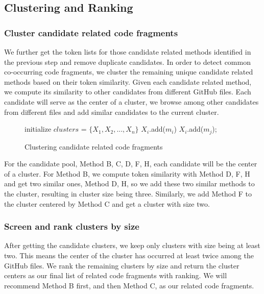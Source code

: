 \subsection{Clustering and Ranking}
\subsubsection{Cluster candidate related code fragments}
We further get the token lists for those candidate related methods identified in the previous step and remove duplicate candidates. In order to detect common co-occurring code fragments, we cluster the remaining unique candidate related methods
based on their token similarity.  Given each candidate related method, we compute its similarity to other candidates from different GitHub files. Each candidate will serve as the center of a cluster, we browse among other candidates from different files and add similar candidates to the current cluster.

\begin{figure}[h]
	\label{alg: Clustering candidate related methods}
	\removelatexerror
	\begin{algorithm}[H]
		\caption{Clustering candidate related code fragments}
		initialize $clusters$ = $\{X_1, X_2,..., X_n\}$\;
		{
			$X_i$.add($m_i$) \;
			{
				{
					{
						$X_i$.add($m_j$);
					}
				}
			} 
		}
	\end{algorithm}
\end{figure}

For the candidate pool, {\ttt Method B, C, D, F, H}, each candidate will be the center of a cluster. For {\ttt Method B}, we compute token similarity with {\ttt Method D, F, H} and get two similar ones, {\ttt Method D, H}, so we add these two similar methods to the cluster, resulting in cluster size being three. Similarly, we add {\ttt Method F} to the cluster centered by {\ttt Method C} and get a cluster with size two.

\subsubsection{Screen and rank clusters by size}
After getting the candidate clusters, we keep only clusters with size being at least two. This means the center of the cluster has occurred at least twice among the GitHub files.
We rank the remaining clusters by size and return the cluster centers as our final list of related code fragments with ranking. We will recommend {\ttt Method B} first, and then {\ttt Method C}, as our related code fragments.